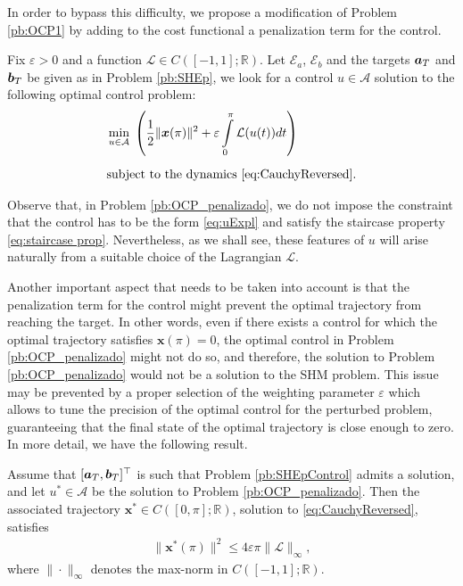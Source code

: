 \documentclass[twocolumn]{autart}    %
\begin{document}
In order to bypass this difficulty, we propose a modification of Problem \ref{pb:OCP1} by adding to the cost functional a penalization term for the control. 

\bigskip

\begin{problem}\label{pb:OCP_penalizado}
Fix $\varepsilon>0$ and a function $\mathcal{L}\in C([-1,1];\mathbb{R})$.  Let $\mathcal{E}_a$, $\mathcal{E}_b$ and the targets $\bm{a}_T$ and $\bm{b}_T$ be given as in Problem \ref{pb:SHEp}, we look for a control $u\in \mathcal A$ solution to the following optimal control problem:
\begin{align*}
	&\displaystyle\min_{u \in \mathcal A}\;\left(\dfrac{1}{2} \|\bm{x}(\pi)\|^2 + \varepsilon \displaystyle\int_0^\pi \mathcal{L}(u(t)) dt\right) 
	\\[5pt] 
	&\text{subject to the dynamics \eqref{eq:CauchyReversed}}.
\end{align*}
\end{problem}
\vspace{-1em}
Observe that, in Problem \ref{pb:OCP_penalizado}, we do not impose the constraint that the control has to be the form \eqref{eq:uExpl} and satisfy the staircase property \eqref{eq:staircase prop}. Nevertheless, as we shall see, these features of $u$ will arise naturally from a suitable choice of the Lagrangian $\mathcal{L}$.

Another important aspect that needs to be taken into account is that the penalization term for the control might prevent the optimal trajectory from reaching the target. In other words, even if there exists a control for which the optimal trajectory satisfies $\bm{x} (\pi) = 0$, the optimal control in Problem \ref{pb:OCP_penalizado} might not do so, and therefore, the solution to Problem \ref{pb:OCP_penalizado} would not be a solution to the SHM problem. This issue may be prevented by a proper selection of the weighting parameter $\varepsilon$ which allows to tune the precision of the optimal control for the perturbed problem, guaranteeing that the final state of the optimal trajectory is close enough to zero. In more detail, we have the following result.

\bigskip

\begin{proposition}\label{Prop:approx controllability}
Assume that $[\bm{a}_T,\bm{b}_T]^\top$ is such that Problem \ref{pb:SHEpControl} admits a solution, and let $u^\ast\in \mathcal A$ be the solution to Problem \ref{pb:OCP_penalizado}. Then the associated trajectory $\bm{x}^\ast\in C([0,\pi];\mathbb{R})$, solution to \eqref{eq:CauchyReversed}, satisfies
\begin{align*} 
	\| \bm{x}^\ast (\pi)  \|^2 \leq  4 \varepsilon \pi \| \mathcal{L}\|_\infty,
\end{align*}
where $\| \cdot\|_\infty$ denotes the max-norm in $C([-1,1]; \mathbb{R})$.
\end{proposition}
\end{document}

